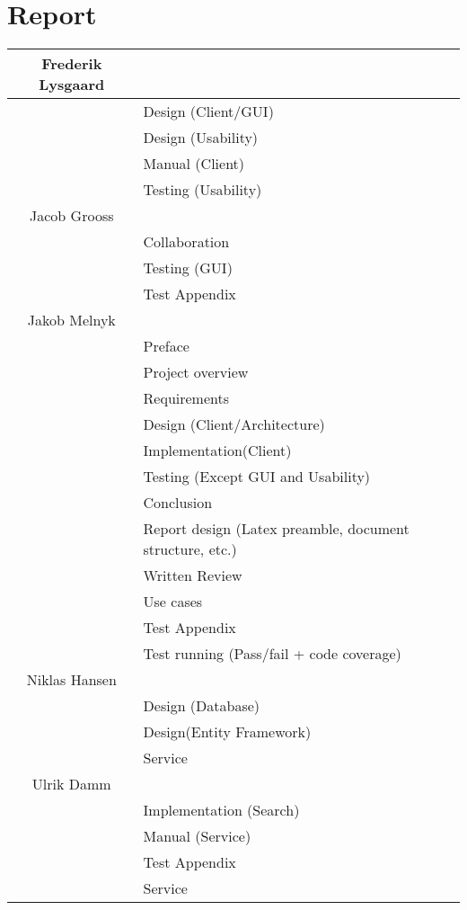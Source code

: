 \section{Report}
\label{Appendix_Who}
\begin{centering}
\begin{longtable}{| c | p{9cm} |}
\hline
Frederik Lysgaard & \\
\hline
& Design (Client/GUI)\\
\hline
& Design (Usability)\\
\hline
& Manual (Client)\\
\hline
& Testing (Usability)\\
\hline
Jacob Grooss & \\
\hline
& Collaboration\\
\hline
& Testing (GUI)\\
\hline
& Test Appendix\\
\hline
Jakob Melnyk & \\
\hline
& Preface\\
\hline
& Project overview\\
\hline
& Requirements\\
\hline
& Design (Client/Architecture)\\
\hline
& Implementation(Client)\\
\hline
& Testing (Except GUI and Usability)\\
\hline
& Conclusion\\
\hline
& Report design (Latex preamble, document structure, etc.)\\
\hline
& Written Review\\
\hline
& Use cases\\
\hline
& Test Appendix\\
\hline
& Test running (Pass/fail + code coverage)\\
\hline
Niklas Hansen & \\
\hline
& Design (Database)\\
\hline
& Design(Entity Framework)\\
\hline
& Service\\
\hline
Ulrik Damm & \\
\hline
& Implementation (Search)\\
\hline
& Manual (Service)\\
\hline
& Test Appendix\\
\hline
& Service\\
\hline
\end{longtable}
\end{centering}